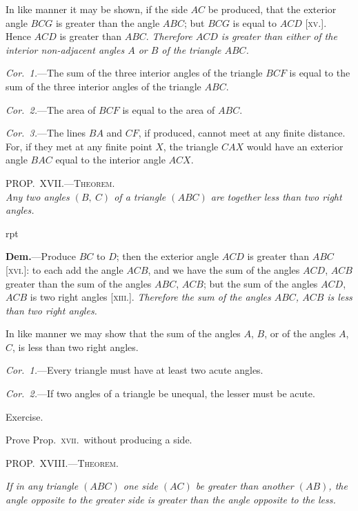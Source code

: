 \documentclass[oneside]{book}
\newcounter{wrapwidth}
\newcommand\myprop[2]{
\bigskip\Needspace*{4\baselineskip}\begin{center}\textsc{#1}\\\medskip\emph{#2}\par\end{center}
}
\newcommand\mypropl[2]{
\bigskip\Needspace*{4\baselineskip}\begin{center}\textsc{#1}\end{center}
\hspace{\parindent}\emph{#2}\par\medskip
}
\newcommand\exhead[1]{
\Needspace*{5\baselineskip}\begin{center}
\textsf{#1}
\end{center}
}
\newcommand\imgflow[3]{
\setcounter{wrapwidth}{#1}

\begin{wrapfigure}[#2]{r}{\value{wrapwidth}pt}
\begin{center}
\vspace{-0.3in}

\end{center}
\end{wrapfigure}
}
\begin{document}
In like manner it may be shown, if the side $AC$ be
produced, that the exterior angle $BCG$ is greater than
the angle $ABC$; but $BCG$ is equal to $ACD$ [\textsc{xv}.]. Hence
$ACD$ is greater than $ABC$. \emph{Therefore $ACD$ is greater
than either of the interior non-adjacent angles $A$ or $B$ of
the triangle $ABC$.}

\textit{Cor.~1.}---The sum of the three interior angles of the
triangle $BCF$ is equal to the sum of the three interior
angles of the triangle $ABC$.

\textit{Cor.~2.}---The area of $BCF$ is equal to the area of
$ABC$.



\textit{Cor.~3.}---The lines $BA$ and $CF$, if produced, cannot
meet at any finite distance. For, if they met at any
finite point $X$, the triangle $CAX$ would have an exterior
angle $BAC$ equal to the interior angle $ACX$.


\myprop{PROP\@.~XVII\@.---Theorem.}{Any two angles $(B,\ C)$ of a triangle $(ABC)$ are together
less than two right angles.}


\imgflow{105}{7}{f032}

\textbf{Dem.}---Produce $BC$ to $D$; then the exterior angle
$ACD$ is greater than $ABC$ [\textsc{xvi.}]:
to each add the angle $ACB$, and
we have the sum of the angles
$ACD$, $ACB$ greater than the sum
of the angles $ABC$, $ACB$; but the
sum of the angles $ACD$, $ACB$ is
two right angles [\textsc{xiii.}]. \textit{Therefore
the sum of the angles $ABC$,
$ACB$ is less than two right angles.}

In like manner we may show that the sum of the
angles $A$, $B$, or of the angles $A$, $C$, is less than two
right angles.

\textit{Cor.~1.}---Every triangle must have at least two
acute angles.

\textit{Cor.~2.}---If two angles of a triangle be unequal, the
lesser must be acute.

\exhead{Exercise.}

\begin{footnotesize}
Prove Prop.~\textsc{xvii.}\ without producing a side.
\par\end{footnotesize}



\mypropl{PROP\@.~XVIII\@.---Theorem.}{If in any triangle $(ABC)$ one side $(AC)$ be greater than
another $(AB)$, the angle opposite to the greater side is
greater than the angle opposite to the less.}
\end{document}
